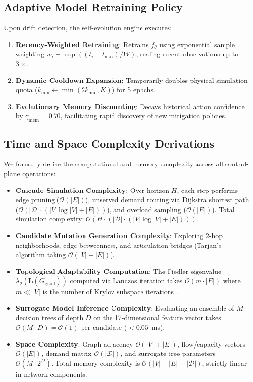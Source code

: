 \documentclass[pdflatex,sn-mathphys-num]{sn-jnl}
\theoremstyle{thmstyleone}
\theoremstyle{thmstyletwo}
\theoremstyle{thmstylethree}
\begin{document}
\subsection{Adaptive Model Retraining Policy}
Upon drift detection, the self-evolution engine executes:
\begin{enumerate}
    \item \textbf{Recency-Weighted Retraining}: Retrains $f_\theta$ using exponential sample weighting $w_i = \exp((t_i - t_{\max}) / W)$, scaling recent observations up to $3\times$.
    \item \textbf{Dynamic Cooldown Expansion}: Temporarily doubles physical simulation quota ($k_{\min} \leftarrow \min(2 k_{\min}, K)$) for 5 epochs.
    \item \textbf{Evolutionary Memory Discounting}: Decays historical action confidence by $\gamma_{\mathrm{mem}} = 0.70$, facilitating rapid discovery of new mitigation policies.
\end{enumerate}

\subsection{Time and Space Complexity Derivations}\label{sec6.6}
We formally derive the computational and memory complexity across all control-plane operations:
\begin{itemize}
    \item \textbf{Cascade Simulation Complexity}: Over horizon $H$, each step performs edge pruning ($\mathcal{O}(|E|)$), unserved demand routing via Dijkstra shortest path ($\mathcal{O}(|\mathcal{D}| \cdot (|V| \log |V| + |E|))$), and overload sampling ($\mathcal{O}(|E|)$). Total simulation complexity: $\mathcal{O}(H \cdot (|\mathcal{D}| \cdot (|V| \log |V| + |E|)))$.
    \item \textbf{Candidate Mutation Generation Complexity}: Exploring 2-hop neighborhoods, edge betweenness, and articulation bridges (Tarjan's algorithm \cite{tarjan1972depth} taking $\mathcal{O}(|V| + |E|)$).
    \item \textbf{Topological Adaptability Computation}: The Fiedler eigenvalue $\lambda_2(\mathbf{L}(G_{\mathrm{giant}}))$ computed via Lanczos iteration takes $\mathcal{O}(m \cdot |E|)$ where $m \ll |V|$ is the number of Krylov subspace iterations \cite{chung1997spectral}.
    \item \textbf{Surrogate Model Inference Complexity}: Evaluating an ensemble of $M$ decision trees of depth $D$ on the 17-dimensional feature vector takes $\mathcal{O}(M \cdot D) = \mathcal{O}(1)$ per candidate ($< 0.05$~ms).
    \item \textbf{Space Complexity}: Graph adjacency $\mathcal{O}(|V| + |E|)$, flow/capacity vectors $\mathcal{O}(|E|)$, demand matrix $\mathcal{O}(|\mathcal{D}|)$, and surrogate tree parameters $\mathcal{O}(M \cdot 2^D)$. Total memory complexity is $\mathcal{O}(|V| + |E| + |\mathcal{D}|)$, strictly linear in network components.
\end{itemize}
\end{document}
